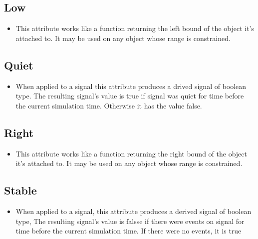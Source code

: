 \documentclass[a4paper,12pt]{article}
\begin{document}
	\subsection*{Low}
	\begin{itemize}
		\item This attribute works like a function returning the left bound of the object it's attached to. It may be used on any object whose range is constrained.
	\end{itemize}
	
	\subsection*{Quiet}
	\begin{itemize}
		\item When applied to a signal this attribute produces a drived signal of boolean type. The resulting signal's value is true if signal was quiet for time before the current simulation time. Otherwise it has the value false.
	\end{itemize}
	
	\subsection*{Right}
	\begin{itemize}
		\item This attribute works like a function returning the right bound of the object it’s attached to. It may be used on any object whose range is constrained.
	\end{itemize}
	
	\subsection*{Stable}
	\begin{itemize}
		\item When applied to a signal, this attribute produces a derived signal of boolean type, The resulting signal's value is falsse if there were events on signal for time before the current simulation time. If there were no events, it is true
	\end{itemize}
	
	
	
	
	
	
\end{document}
